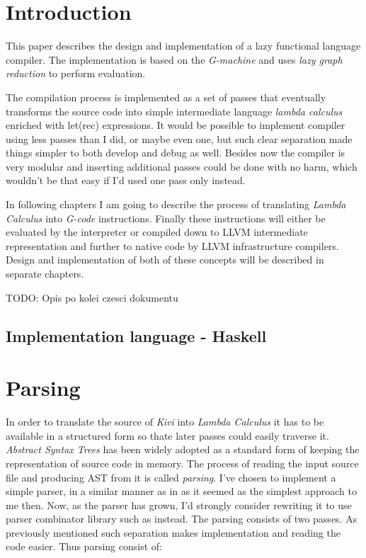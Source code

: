 \documentclass[a4paper]{report}
\begin{document}
\normalsize
{}

\tableofcontents

\chapter{Introduction}

This paper describes the design and implementation of a lazy functional
language compiler. The implementation is based on the
\textit{G-machine}\cite{jones87} and uses \textit{lazy graph reduction} to
perform evaluation.

The compilation process is implemented as a set of passes that eventually
transforms the source code into simple intermediate language \textit{lambda
calculus} enriched with let(rec) expressions. It would be possible to implement
compiler using less passes than I did, or maybe even one, but such clear
separation made things simpler to both develop and debug as well. Besides now
the compiler is very modular and inserting additional passes could be done with
no harm, which wouldn't be that easy if I'd used one pass only instead.


In following chapters I am going to describe the process of translating
\textit{Lambda Calculus} into \textit{G-code} instructions.  Finally these
instructions will either be evaluated by the interpreter or compiled down to
LLVM intermediate representation and further to native code by LLVM
infrastructure compilers. Design and implementation of both of these concepts
will be described in separate chapters.

TODO: Opis po kolei czesci dokumentu

\section{Implementation language - Haskell}


\chapter{Parsing}

In order to translate the source of \textit{Kivi} into \textit{Lambda Calculus}
it has to be available in a structured form so thate later passes could easily
traverse it. \textit{Abstract Syntax Trees}\cite{wiki:ast} has been widely adopted as a
standard form of keeping the representation of source code in memory. The
process of reading the input source file and producing AST from it is called
\textit{parsing}.
I've chosen to implement a simple parser, in a similar manner as in
\cite{joneslester00} as it seemed as the simplest approach to me then. Now, as
the parser has grown, I'd strongly consider rewriting it to use parser combinator
library such as \cite{website:parsec} instead.  The parsing consists of two
passes. As previously mentioned such separation makes implementation and
reading the code easier. Thus parsing consist of:
\end{document}
